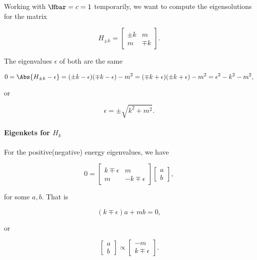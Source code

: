 Working with \( \Hbar = c = 1 \) temporarily, we want to compute the eigensolutions for the matrix

\begin{dmath}\label{eqn:gradQuantumProblemSet4Problem3:80}
H_{\pm k}
=
\begin{bmatrix}
\pm k & m \\
m & \mp k
\end{bmatrix}.
\end{dmath}

The eigenvalues \( \epsilon \) of both are the same

\begin{dmath}\label{eqn:gradQuantumProblemSet4Problem3:100}
0 
= 
\Abs{ H_{\pm k} - \epsilon }
=
(\pm k - \epsilon)(\mp k - \epsilon) - m^2
=
(\mp k + \epsilon)(\pm k + \epsilon) - m^2
= 
\epsilon^2 - k^2 - m^2,
\end{dmath}

or

\begin{dmath}\label{eqn:gradQuantumProblemSet4Problem3:120}
\epsilon = \pm \sqrt{k^2 + m^2}.
\end{dmath}

\paragraph{Eigenkets for \( H_k \)}

For the positive(negative) energy eigenvalues, we have

\begin{dmath}\label{eqn:gradQuantumProblemSet4Problem3:140}
0 
=
\begin{bmatrix}
k \mp \epsilon & m \\
m & -k \mp \epsilon
\end{bmatrix}
\begin{bmatrix}
a \\
b
\end{bmatrix},
\end{dmath}

for some \( a, b\).  That is

\begin{dmath}\label{eqn:gradQuantumProblemSet4Problem3:160}
(k \mp \epsilon) a + m b = 0,
\end{dmath}

or 

\begin{dmath}\label{eqn:gradQuantumProblemSet4Problem3:180}
\begin{bmatrix}
a \\
b
\end{bmatrix}
\propto
\begin{bmatrix}
- m \\
k \mp \epsilon
\end{bmatrix}.
\end{dmath}

